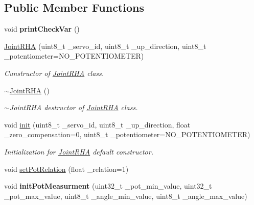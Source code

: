 \subsection*{Public Member Functions}
\begin{DoxyCompactItemize}
\item 
void {\bfseries print\+Check\+Var} ()\hypertarget{classJointRHA_a21a6d1e5b1eb7844e62fdfa1d1941701}{}\label{classJointRHA_a21a6d1e5b1eb7844e62fdfa1d1941701}

\item 
\hyperlink{classJointRHA_a27538101f833541965c24023a167f709}{Joint\+R\+HA} (uint8\+\_\+t \+\_\+servo\+\_\+id, uint8\+\_\+t \+\_\+up\+\_\+direction, uint8\+\_\+t \+\_\+potentiometer=N\+O\+\_\+\+P\+O\+T\+E\+N\+T\+I\+O\+M\+E\+T\+ER)
\begin{DoxyCompactList}\small\item\em Cunstructor of \hyperlink{classJointRHA}{Joint\+R\+HA} class. \end{DoxyCompactList}\item 
\hyperlink{classJointRHA_a9e54cc4dde103847c9d17f329302a981}{$\sim$\+Joint\+R\+HA} ()\hypertarget{classJointRHA_a9e54cc4dde103847c9d17f329302a981}{}\label{classJointRHA_a9e54cc4dde103847c9d17f329302a981}

\begin{DoxyCompactList}\small\item\em $\sim$\+Joint\+R\+HA destructor of \hyperlink{classJointRHA}{Joint\+R\+HA} class. \end{DoxyCompactList}\item 
void \hyperlink{classJointRHA_a399fcac49d1c527cae46df726c71b5dd}{init} (uint8\+\_\+t \+\_\+servo\+\_\+id, uint8\+\_\+t \+\_\+up\+\_\+direction, float \+\_\+zero\+\_\+compensation=0, uint8\+\_\+t \+\_\+potentiometer=N\+O\+\_\+\+P\+O\+T\+E\+N\+T\+I\+O\+M\+E\+T\+ER)
\begin{DoxyCompactList}\small\item\em Initialization for \hyperlink{classJointRHA}{Joint\+R\+HA} default constructor. \end{DoxyCompactList}\item 
void \hyperlink{classJointRHA_aa3d76b4209929ff800438e5c735697b5}{set\+Pot\+Relation} (float \+\_\+relation=1)
\item 
void {\bfseries init\+Pot\+Measurment} (uint32\+\_\+t \+\_\+pot\+\_\+min\+\_\+value, uint32\+\_\+t \+\_\+pot\+\_\+max\+\_\+value, uint8\+\_\+t \+\_\+angle\+\_\+min\+\_\+value, uint8\+\_\+t \+\_\+angle\+\_\+max\+\_\+value)\hypertarget{classJointRHA_ab2f7b710e7d609c87376b8ed0ef11f42}{}\label{classJointRHA_ab2f7b710e7d609c87376b8ed0ef11f42}


\end{DoxyCompactItemize}
